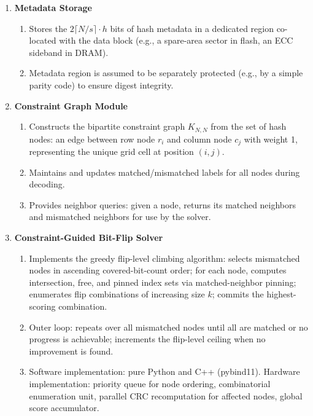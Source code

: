 \begin{enumerate}
    \item \textbf{Metadata Storage}
        \begin{enumerate}
            \item Stores the $2\lceil N/s \rceil \cdot h$ bits of hash metadata in a dedicated region co-located with the data block (e.g., a spare-area sector in flash, an ECC sideband in DRAM).
            \item Metadata region is assumed to be separately protected (e.g., by a simple parity code) to ensure digest integrity.
        \end{enumerate}

    \item \textbf{Constraint Graph Module}
        \begin{enumerate}
            \item Constructs the bipartite constraint graph $K_{N,N}$ from the set of hash nodes: an edge between row node $r_i$ and column node $c_j$ with weight 1, representing the unique grid cell at position $(i, j)$.
            \item Maintains and updates matched/mismatched labels for all nodes during decoding.
            \item Provides neighbor queries: given a node, returns its matched neighbors and mismatched neighbors for use by the solver.
        \end{enumerate}

    \item \textbf{Constraint-Guided Bit-Flip Solver}
        \begin{enumerate}
            \item Implements the greedy flip-level climbing algorithm: selects mismatched nodes in ascending covered-bit-count order; for each node, computes intersection, free, and pinned index sets via matched-neighbor pinning; enumerates flip combinations of increasing size $k$; commits the highest-scoring combination.
            \item Outer loop: repeats over all mismatched nodes until all are matched or no progress is achievable; increments the flip-level ceiling when no improvement is found.
            \item Software implementation: pure Python and C++ (pybind11). Hardware implementation: priority queue for node ordering, combinatorial enumeration unit, parallel CRC recomputation for affected nodes, global score accumulator.
        \end{enumerate}


\end{enumerate}
